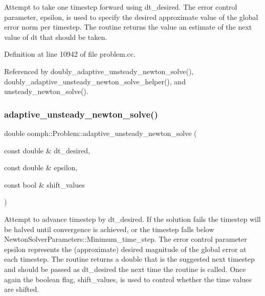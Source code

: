 Attempt to take one timestep forward using dt\+\_\+desired. The error control parameter, epsilon, is used to specify the desired approximate value of the global error norm per timestep. The routine returns the value an estimate of the next value of dt that should be taken. 

Definition at line 10942 of file problem.\+cc.



Referenced by doubly\+\_\+adaptive\+\_\+unsteady\+\_\+newton\+\_\+solve(), doubly\+\_\+adaptive\+\_\+unsteady\+\_\+newton\+\_\+solve\+\_\+helper(), and unsteady\+\_\+newton\+\_\+solve().

\mbox{\label{classoomph_1_1Problem_a3f5bde6d7fa8972e01a20c522b5fb2ef}} 
\subsubsection{\texorpdfstring{adaptive\+\_\+unsteady\+\_\+newton\+\_\+solve()}{adaptive\_unsteady\_newton\_solve()}\hspace{0.1cm}{\footnotesize\ttfamily [2/2]}}
{\footnotesize\ttfamily double oomph\+::\+Problem\+::adaptive\+\_\+unsteady\+\_\+newton\+\_\+solve (\begin{DoxyParamCaption}\item[{const double \&}]{dt\+\_\+desired,  }\item[{const double \&}]{epsilon,  }\item[{const bool \&}]{shift\+\_\+values }\end{DoxyParamCaption})}



Attempt to advance timestep by dt\+\_\+desired. If the solution fails the timestep will be halved until convergence is achieved, or the timestep falls below Newton\+Solver\+Parameters\+::\+Minimum\+\_\+time\+\_\+step. The error control parameter epsilon represents the (approximate) desired magnitude of the global error at each timestep. The routine returns a double that is the suggested next timestep and should be passed as dt\+\_\+desired the next time the routine is called. Once again the boolean flag, shift\+\_\+values, is used to control whether the time values are shifted. 

